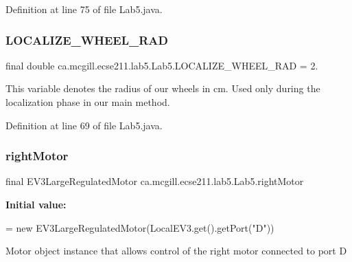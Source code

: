 Definition at line 75 of file Lab5.\+java.

\mbox{\label{classca_1_1mcgill_1_1ecse211_1_1lab5_1_1_lab5_a6bc8fbcc688c767a11226cb7b5da3411}} 
\subsubsection{\texorpdfstring{L\+O\+C\+A\+L\+I\+Z\+E\+\_\+\+W\+H\+E\+E\+L\+\_\+\+R\+AD}{LOCALIZE\_WHEEL\_RAD}}
{\footnotesize\ttfamily final double ca.\+mcgill.\+ecse211.\+lab5.\+Lab5.\+L\+O\+C\+A\+L\+I\+Z\+E\+\_\+\+W\+H\+E\+E\+L\+\_\+\+R\+AD = 2.\hspace{0.3cm}{\ttfamily [static]}}

This variable denotes the radius of our wheels in cm. Used only during the localization phase in our main method. 

Definition at line 69 of file Lab5.\+java.

\mbox{\label{classca_1_1mcgill_1_1ecse211_1_1lab5_1_1_lab5_a70575e1c6e84cd9d22cadd141ad6ceae}} 
\subsubsection{\texorpdfstring{right\+Motor}{rightMotor}}
{\footnotesize\ttfamily final E\+V3\+Large\+Regulated\+Motor ca.\+mcgill.\+ecse211.\+lab5.\+Lab5.\+right\+Motor\hspace{0.3cm}{\ttfamily [static]}}

{\bfseries Initial value\+:}
\begin{DoxyCode}
=
      \textcolor{keyword}{new} EV3LargeRegulatedMotor(LocalEV3.get().getPort(\textcolor{stringliteral}{"D"}))
\end{DoxyCode}
Motor object instance that allows control of the right motor connected to port D 

